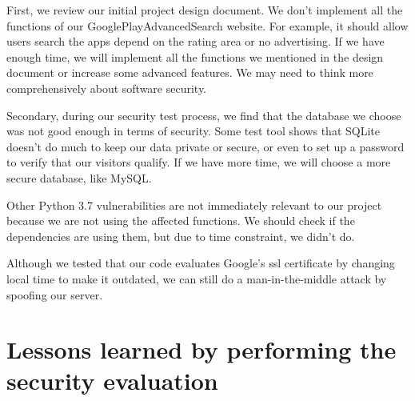 \documentclass[12pt, a4paper]{article}
\begin{document}


First, we review our initial project design document. We don't implement all the functions of our GooglePlayAdvancedSearch website. For example, it should allow users search the apps depend on the rating area or no advertising. If we have enough time, we will implement all the functions we mentioned in the design document or increase some advanced features. We may need to think more comprehensively about software security.

Secondary, during our security test process, we find that the database we choose was not good enough in terms of security. Some test tool shows that SQLite doesn't do much to keep our data private or secure, or even to set up a password to verify that our visitors qualify. If we have more time, we will choose a more secure database, like MySQL.

Other Python 3.7 vulnerabilities are not immediately relevant to our project because we are not using the affected functions. We should check if the dependencies are using them, but due to time constraint, we didn't do.

Although we tested that our code evaluates Google's ssl certificate by changing local time to make it outdated, we can still do a man-in-the-middle attack by spoofing our server. 

\section{Lessons learned by performing the security evaluation}
\end{document}
